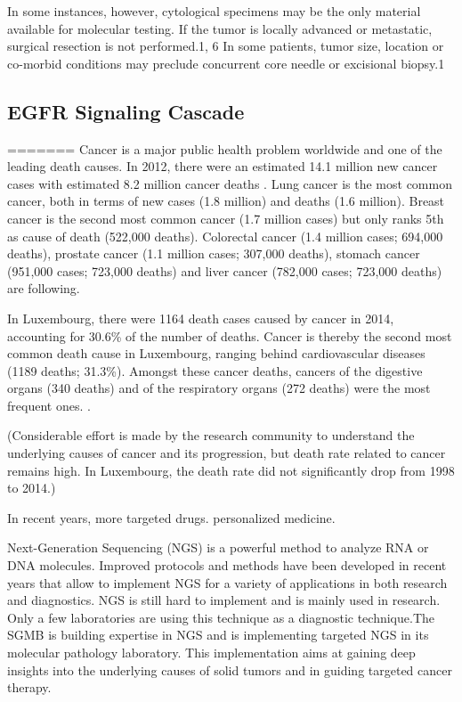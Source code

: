 In some instances, however, cytological specimens may be the only material available for molecular testing. If the tumor is locally advanced or metastatic, surgical resection is not performed.1, 6 In some patients, tumor size, location or co-morbid conditions may preclude concurrent core needle or excisional biopsy.1

\subsection{EGFR Signaling Cascade}
=======
Cancer is a major public health problem worldwide and one of the leading death
causes. In 2012, there were an estimated 14.1 million new cancer cases with
estimated  8.2 million cancer deaths {\cite{cancer_stats_worldwide:2012}}. Lung
cancer is the most common cancer, both in terms of new cases (1.8 million) and
deaths (1.6 million). Breast  cancer is the second most common cancer (1.7
million cases) but only ranks 5th as cause of death (522,000 deaths). Colorectal
cancer (1.4 million cases; 694,000 deaths), prostate cancer (1.1 million cases;
307,000 deaths), stomach cancer (951,000 cases; 723,000 deaths) and liver cancer
(782,000 cases; 723,000 deaths) are following.

In Luxembourg, there were 1164 death cases caused by cancer in 2014, accounting
for 30.6\%  of the number of deaths. Cancer is thereby the second most common
death cause in Luxembourg, ranging behind cardiovascular diseases (1189 deaths;
31.3\%). Amongst these cancer deaths, cancers of the digestive organs (340
deaths) and of the respiratory organs (272 deaths) were the most frequent ones.
{\cite{cancer_stats:2012}}.

(Considerable effort is made by the research
community to understand the underlying causes of cancer and its progression, but
death rate related to cancer remains high. In Luxembourg, the death rate did not
significantly drop from 1998 to 2014.)

In recent years, more targeted drugs. personalized medicine.

Next-Generation Sequencing (NGS) is a powerful method to analyze RNA or DNA
molecules. Improved protocols and methods have been developed in recent years
that allow to implement NGS for a variety of applications in both research and
diagnostics. NGS is still hard to implement and is mainly used in research. Only
a few laboratories are using this technique as a diagnostic technique.The SGMB
is building expertise in NGS and is implementing targeted NGS in its molecular
pathology laboratory. This implementation aims at gaining deep insights into the
underlying causes of solid tumors and in guiding targeted cancer therapy.

